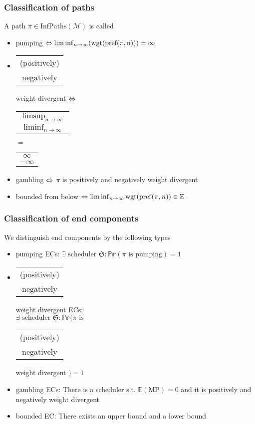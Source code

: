 \documentclass[onlymath]{beamer}
\begin{document}
\begin{frame}
	\frametitle{Classification of paths}
	A path $\pi \in \mathrm{InfPaths}(\mathcal{M})$ is called 
	\begin{itemize}
		\item pumping $\ratio\Leftrightarrow \liminf_{n \to \infty}(\mathrm{wgt}(\mathrm{pref(\pi, n)})) = \infty$ \pause
		\item \begin{tabular}{c}(positively) \\ negatively \end{tabular} weight divergent $\ratio\Leftrightarrow$ \begin{tabular}{c} $\limsup_{n \to \infty}$ \\ $\liminf_{n \to \infty}$ \end{tabular} $=$ \begin{tabular}{c} ${\infty}$ \\ ${-\infty}$ \end{tabular} \pause
		\item gambling $\ratio\Leftrightarrow$ $\pi$ is positively and negatively weight divergent \pause
		\item bounded from below $\ratio\Leftrightarrow \liminf_{n \to \infty} \mathrm{wgt}(\mathrm{pref}(\pi,n)) \in \mathbb{Z}$
	\end{itemize}
\end{frame}

\begin{frame}
\frametitle{Classification of end components}
We distinguish end components by the following types
\begin{itemize}
	\item pumping ECs: $\exists \text{ scheduler } \mathfrak{S}: \mathbb{Pr}(\pi \text{ is pumping}) = 1$ \pause
	\item \begin{tabular}{c}(positively) \\ negatively \end{tabular} weight divergent ECs:\\ \hspace{-2ex}$\exists \text{ scheduler } \mathfrak{S}: \mathbb{Pr}\Big(\pi \text{ is }$ \begin{tabular}{c}(positively) \\ negatively \end{tabular} weight divergent $\Big) = 1$ \pause
	\item gambling ECs: There is a scheduler s.t. $\mathbb{E}(\mathrm{MP}) = 0$ and it is positively and negatively weight divergent \pause
	\item bounded EC: There exists an upper bound and a lower bound
\end{itemize}
\end{frame}
\end{document}
